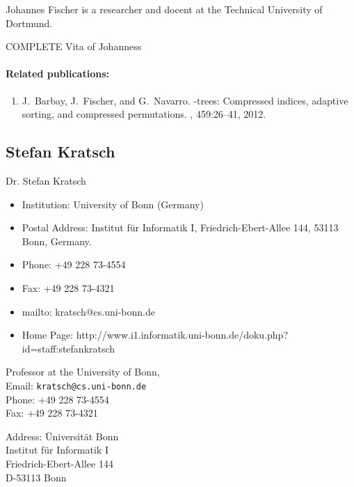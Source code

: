 \documentclass[a4paper,10pt]{article}
\begin{document}
Johannes Fischer  is a researcher and docent at the Technical University of Dortmund.
\begin{TODO}
COMPLETE Vita of Johanness
\end{TODO}

\paragraph{Related publications:}
\begin{enumerate}
\item
J.~Barbay, J.~Fischer, and G.~Navarro.
-trees: Compressed indices, adaptive sorting, and compressed
  permutations.
, 459:26--41,
  2012.
\end{enumerate}

\subsection*{Stefan Kratsch}

Dr. Stefan Kratsch
  \begin{itemize}
\item Institution: University of Bonn (Germany)
\item Postal Address: Institut f\"ur Informatik I, Friedrich-Ebert-Allee 144, 53113 Bonn, Germany.
\item Phone: +49 228 73-4554
\item Fax: +49 228 73-4321 
\item mailto: kratsch@cs.uni-bonn.de
\item Home Page: http://www.i1.informatik.uni-bonn.de/doku.php?id=staff:stefankratsch
  \end{itemize}

\begin{multicols}{2}
\noindent Professor at the University of Bonn, \\
Email: \texttt{kratsch@cs.uni-bonn.de} \\
Phone: +49 228 73-4554\\
Fax: +49 228 73-4321
\begin{tabbing}
Address: \= Universit\"at Bonn\\
\> Institut f\"ur Informatik I\\
\> Friedrich-Ebert-Allee 144\\
\> D-53113 Bonn
\end{tabbing}
\end{multicols}
\end{document}
